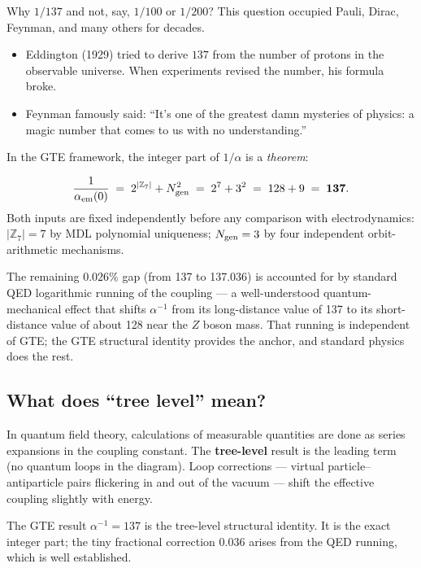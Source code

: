 \documentclass[11pt,a4paper]{article}
\newcommand{\term}[1]{\textbf{#1}}
\newcommand{\ZS}{\mathbb{Z}_7}
\newcommand{\Ngen}{N_{\rm gen}}
\begin{document}
Why $1/137$ and not, say, $1/100$ or $1/200$?  This question occupied
Pauli, Dirac, Feynman, and many others for decades.
\begin{itemize}
  \item Eddington (1929) tried to derive $137$ from the number of protons
        in the observable universe.  When experiments revised the number,
        his formula broke.
  \item Feynman famously said: ``It's one of the greatest damn mysteries
        of physics: a magic number that comes to us with no understanding.''
\end{itemize}

\noindent
In the GTE framework, the integer part of $1/\alpha$ is a \emph{theorem}:

\begin{tcolorbox}[colback=boxgreen,colframe=green!50!black,
  title={GTE Result: Fine-Structure Constant (\texttt{alpha\_em\_inverse\_structural\_identity}, machine-certified)}]
\[
  \frac{1}{\alpha_{\rm em}(0)} \;=\; 2^{|\ZS|} + \Ngen^2
  \;=\; 2^7 + 3^2 \;=\; 128 + 9 \;=\; \mathbf{137}.
\]
Both inputs are fixed independently before any comparison with electrodynamics:
$|\ZS| = 7$ by MDL polynomial uniqueness; $\Ngen = 3$ by four independent
orbit-arithmetic mechanisms.
\end{tcolorbox}

\noindent
The remaining $0.026\%$ gap (from 137 to 137.036) is accounted for by
standard QED logarithmic running of the coupling — a well-understood
quantum-mechanical effect that shifts $\alpha^{-1}$ from its long-distance
value of 137 to its short-distance value of about 128 near the $Z$ boson mass.
That running is independent of GTE; the GTE structural identity provides
the anchor, and standard physics does the rest.

\subsection{What does ``tree level'' mean?}

In quantum field theory, calculations of measurable quantities are done as
series expansions in the coupling constant.  The \term{tree-level} result is
the leading term (no quantum loops in the diagram).  Loop corrections ---
virtual particle--antiparticle pairs flickering in and out of the vacuum ---
shift the effective coupling slightly with energy.

The GTE result $\alpha^{-1} = 137$ is the tree-level structural identity.
It is the exact integer part; the tiny fractional correction $0.036$
arises from the QED running, which is well established.
\end{document}
